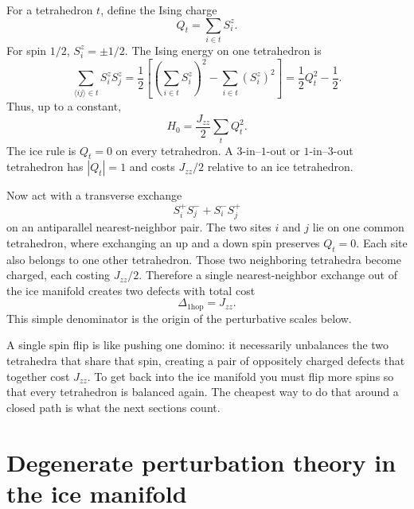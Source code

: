 \documentclass[11pt,letterpaper]{article}
\newcommand{\Jzz}{J_{zz}}
\theoremstyle{plain}
\theoremstyle{definition}
\begin{document}
For a tetrahedron $t$, define the Ising charge
\begin{equation}
Q_t=\sum_{i\in t} S_i^z .
\end{equation}
For spin $1/2$, $S_i^z=\pm 1/2$.  The Ising energy on one tetrahedron is
\begin{equation}
\sum_{\langle ij\rangle\in t} S_i^zS_j^z
=\frac12\left[\left(\sum_{i\in t}S_i^z\right)^2-\sum_{i\in t}(S_i^z)^2\right]
=\frac12 Q_t^2-\frac12 .
\label{eq:tet_energy}
\end{equation}
Thus, up to a constant,
\begin{equation}
H_0=\frac{\Jzz}{2}\sum_t Q_t^2 .
\label{eq:charge_h0}
\end{equation}
The ice rule is $Q_t=0$ on every tetrahedron.  A $3$-in--$1$-out or
$1$-in--$3$-out tetrahedron has $|Q_t|=1$ and costs $\Jzz/2$ relative to an
ice tetrahedron.

Now act with a transverse exchange
\[
S_i^+S_j^-+S_i^-S_j^+
\]
on an antiparallel nearest-neighbor pair.  The two sites $i$ and $j$ lie on
one common tetrahedron, where exchanging an up and a down spin preserves
$Q_t=0$.  Each site also belongs to one other tetrahedron.  Those two
neighboring tetrahedra become charged, each costing $\Jzz/2$.  Therefore a
single nearest-neighbor exchange out of the ice manifold creates two
defects with total cost
\begin{equation}
\Delta_{\mathrm{1hop}}=\Jzz .
\label{eq:one_hop_cost}
\end{equation}
This simple denominator is the origin of the perturbative scales below.

\begin{intuition}
A single spin flip is like pushing one domino: it necessarily unbalances
the two tetrahedra that share that spin, creating a pair of oppositely
charged defects that together cost $\Jzz$.  To get back into the ice manifold
you must flip more spins so that every tetrahedron is balanced again.  The
cheapest way to do that around a closed path is what the next sections count.
\end{intuition}

\section{Degenerate perturbation theory in the ice manifold}
\end{document}
